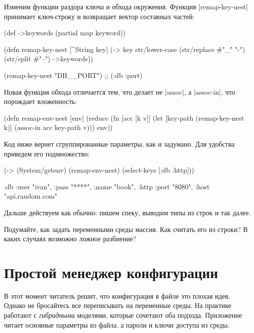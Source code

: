Изменим функции раздора ключа и обхода окружения. Функция
\spverb|remap-key-nest| принимает ключ-строку и возвращает вектор составных
частей:

\begin{english}
  \begin{clojure}
(def ->keywords (partial map keyword))

(defn remap-key-nest
  [^String key]
  (-> key
      str/lower-case
      (str/replace #"_" "-")
      (str/split #"--")
      ->keywords))

(remap-key-nest "DB__PORT")
;; (:db :port)
  \end{clojure}
\end{english}

Новая функция обхода отличается тем, что делает не \spverb|assoc|, а
\spverb|assoc-in|, что порождает вложенность:

\begin{english}
  \begin{clojure}
(defn remap-env-nest
  [env]
  (reduce
   (fn [acc [k v]]
     (let [key-path (remap-key-nest k)]
       (assoc-in acc key-path v)))
   {}
   env))
  \end{clojure}
\end{english}

Код ниже вернет сгруппированные параметры, как и задумано. Для удобства приведем
его подмножество:

\begin{english}
  \begin{clojure}
(-> (System/getenv)
    (remap-env-nest)
    (select-keys [:db :http]))

{:db {:user "ivan", :pass "****", :name "book"},
 :http {:port "8080", :host "api.random.com"}}
  \end{clojure}
\end{english}

\noindent
Дальше действуем как обычно: пишем спеку, выводим типы из строк и так далее.

Подумайте, как задать переменными среды массив. Как считать его из строки? В
каких случаях возможно ложное разбиение?

\section{Простой менеджер конфигурации}

В этот момент читатель решит, что конфигурация в файле это плохая идея. Однако
не бросайтесь все переписывать на переменные среды. На практике работают с
\emph{гибридными} моделями, которые сочетают оба подхода. Приложение читает
основные параметры из файла, а пароли и ключи доступа из среды.

